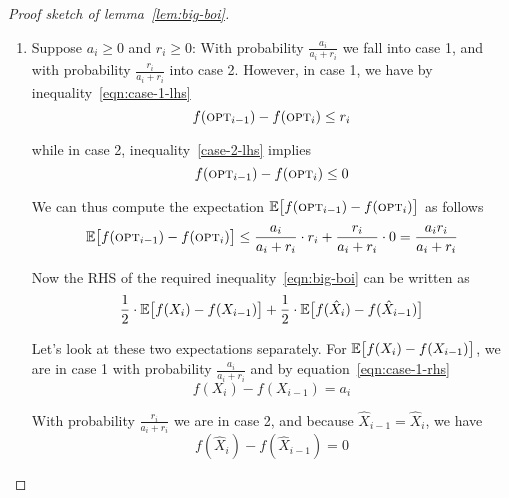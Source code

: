 \documentclass{article}
\begin{document}
\begin{proof}[Proof sketch of lemma~\ref{lem:big-boi}]
\begin{enumerate}
Certainly, $0 \leq \frac{1}{2} \cdot r_i$ thus expanding out $r_i$ derives
\begin{equation}\label{case-2-rhs}
\frac{1}{2} \cdot r_i
= \frac{1}{2} \cdot \big( f(\hat{X}_{i-1} \cup \{ i \}) - f(\hat{X}_{i-1}) \big)
= \frac{1}{2} \cdot \big( (f(X_i \cup \{ i \}) - f(X_{i-1})) + (f(\hat{X}_i) - f(\hat{X}_{i-1})) \big)
\end{equation}

The addition of term $f(X_i \cup \{ i \}) - f(X_{i-1})$ follows as $f(X_i \cup \{ i \}) - f(X_{i-1}) = 0$ because $X_i = X_{i-1}$. Combining our calculations for this case derives the required inequality.

\item Suppose $a_i \geq 0$ and $r_i \geq 0$: With probability $\frac{a_i}{a_i + r_i}$ we fall into case 1, and with probability $\frac{r_i}{a_i + r_i}$ into case 2. However, in case 1, we have by inequality~\ref{eqn:case-1-lhs}
\begin{equation*}
f(\textup{\textsc{opt}}_{i-1}) - f(\textup{\textsc{opt}}_i) \leq r_i
\end{equation*}

while in case 2, inequality~\ref{case-2-lhs} implies
\begin{equation*}
f(\textup{\textsc{opt}}_{i-1}) - f(\textup{\textsc{opt}}_i) \leq 0
\end{equation*}

We can thus compute the expectation $\mathbb{E} \big[ f(\textup{\textsc{opt}}_{i-1}) - f(\textup{\textsc{opt}}_i) \big]$ as follows
\begin{equation}\label{eqn:expect-LHS}
\mathbb{E} \big[ f(\textup{\textsc{opt}}_{i-1}) - f(\textup{\textsc{opt}}_i) \big]
\leq \frac{a_i}{a_i + r_i} \cdot r_i + \frac{r_i}{a_i + r_i} \cdot 0
= \frac{a_i r_i}{a_i + r_i}
\end{equation}

Now the RHS of the required inequality~\ref{eqn:big-boi} can be written as
\begin{equation*}
\frac{1}{2} \cdot \mathbb{E} \big[ f(X_i) - f(X_{i-1}) \big] + \frac{1}{2} \cdot \mathbb{E} \big[ f(\hat{X}_i) - f(\hat{X}_{i-1}) \big]
\end{equation*}

Let's look at these two expectations separately. For $\mathbb{E} \big[ f(X_i) - f(X_{i-1}) \big]$, we are in case 1 with probability $\frac{a_i}{a_i + r_i}$ and by equation~\ref{eqn:case-1-rhs}
\begin{equation*}
f(X_i) - f(X_{i-1}) = a_i
\end{equation*}

With probability $\frac{r_i}{a_i + r_i}$ we are in case 2, and because $\hat{X}_{i-1} = \hat{X}_i$, we have
\begin{equation*}
f(\hat{X}_i) - f(\hat{X}_{i-1}) = 0
\end{equation*}


\end{enumerate}
\end{proof}
\end{document}
